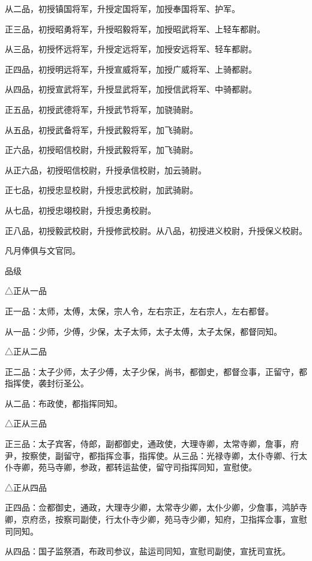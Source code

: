 \documentclass[a4paper,12pt,UTF8,twoside]{ctexbook}
\begin{document}
    从二品，初授镇国将军，升授定国将军，加授奉国将军、护军。
    
    正三品，初授昭勇将军，升授昭毅将军，加授昭武将军、上轻车都尉。
    
    从三品，初授怀远将军，升授定远将军，加授安远将军、轻车都尉。
    
    正四品，初授明远将军，升授宣威将军，加授广威将军、上骑都尉。
    
    从四品，初授宣武将军，升授显武将军，加授信武将军、中骑都尉。
    
    正五品，初授武德将军，升授武节将军，加骁骑尉。
    
    从五品，初授武备将军，升授武毅将军，加飞骑尉。
    
    正六品，初授昭信校尉，升授武毅将军，加飞骑尉。
    
    从正六品，初授昭信校尉，升授承信校尉，加云骑尉。
    
    正七品，初授忠显校尉，升授忠武校尉，加武骑尉。
    
    从七品，初授忠翊校尉，升授忠勇校尉。
    
    正八品，初授毅武校尉，升授修武校尉。从八品，初授进义校尉，升授保义校尉。
    
    凡月俸俱与文官同。
    
    品级
    
    △正从一品
    
    正一品：太师，太傅，太保，宗人令，左右宗正，左右宗人，左右都督。
    
    从一品：少师，少傅，少保，太子太师，太子太傅，太子太保，都督同知。
    
    △正从二品
    
    正二品：太子少师，太子少傅，太子少保，尚书，都御史，都督佥事，正留守，都指挥使，袭封衍圣公。
    
    从二品：布政使，都指挥同知。
    
    △正从三品
    
    正三品：太子宾客，侍郎，副都御史，通政使，大理寺卿，太常寺卿，詹事，府尹，按察使，副留守，都指挥佥事，指挥使。从三品：光禄寺卿，太仆寺卿、行太仆寺卿，苑马寺卿，参政，都转运盐使，留守司指挥同知，宣慰使。
    
    △正从四品
    
    正四品：佥都御史，通政，大理寺少卿，太常寺少卿，太仆少卿，少詹事，鸿胪寺卿，京府丞，按察司副使，行太仆寺少卿，苑马寺少卿，知府，卫指挥佥事，宣慰司同知。
    
    从四品：国子监祭酒，布政司参议，盐运司同知，宣慰司副使，宣抚司宣抚。
    
\end{document}
